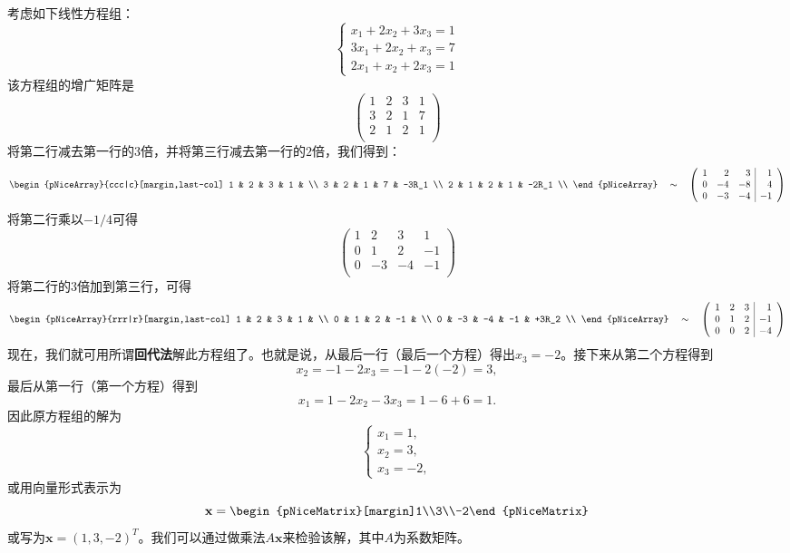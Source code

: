 考虑如下线性方程组：\[\left\{\begin{array}{c}x_1+2x_2+3x_3=1\\3x_1+2x_2+x_3=7\\2x_1+x_2+2x_3=1\end{array}\right.\]
该方程组的增广矩阵是
\[\left(
  \begin{array}{ccc|c}
      1 & 2 & 3 & 1   \\
      3 & 2 & 1 & 7   \\
      2 & 1 & 2 & 1   \\
    \end{array}
  \right)\]
将第二行减去第一行的$3$倍，并将第三行减去第一行的$2$倍，我们得到：
\[\begin{pNiceArray}{ccc|c}[margin,last-col]
  1 & 2 & 3 & 1 &  \\
  3 & 2 & 1 & 7 & -3R_1  \\
  2 & 1 & 2 & 1 & -2R_1 \\
\end{pNiceArray} \quad\sim\quad \left(
  \begin{array}{rrr|r}
      1 & 2 & 3 & 1   \\
      0 & -4 & -8 & 4   \\
      0 & -3 & -4 & -1   \\
    \end{array}
  \right)
\]
将第二行乘以$-1/4$可得
\[\left(
  \begin{array}{rrr|r}
    1 & 2 & 3 & 1   \\
    0 & 1 & 2 & -1   \\
    0 & -3 & -4 & -1   \\
  \end{array}
\right)\]
将第二行的$3$倍加到第三行，可得
\[\begin{pNiceArray}{rrr|r}[margin,last-col]
  1 & 2 & 3 & 1 &  \\
  0 & 1 & 2 & -1 &   \\
  0 & -3 & -4 & -1 & +3R_2 \\
\end{pNiceArray} \quad\sim\quad \left(
  \begin{array}{rrr|r}
      1 & 2 & 3 & 1   \\
      0 & 1 & 2 & -1   \\
      0 & 0 & 2 & -4   \\
    \end{array}
  \right)
\]
现在，我们就可用所谓{\bf 回代法}解此方程组了。也就是说，从最后一行（最后一个方程）得出$x_3 = -2$。接下来从第二个方程得到\[x_2=-1-2x_3=-1-2(-2)=3,\]
最后从第一行（第一个方程）得到\[x_1=1-2x_2-3x_3=1-6+6=1.\]
因此原方程组的解为\[\left\{\begin{array}{l}x_1=1,\\x_2=3,\\x_3=-2,\end{array}\right.\]
或用向量形式表示为\[\mathbf{x}=\begin{pNiceMatrix}[margin]1\\3\\-2\end{pNiceMatrix}\]
或写为$\mathbf{x}=(1,3,-2)^T$。我们可以通过做乘法$A\mathbf{x}$来检验该解，其中$A$为系数矩阵。

